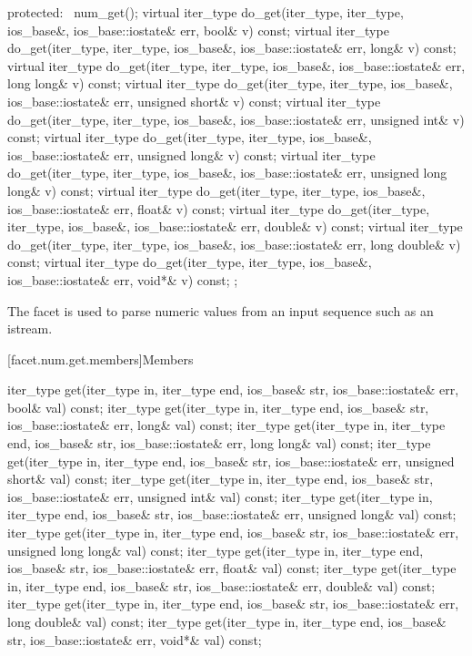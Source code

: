 \begin{codeblock}
{{  protected:
    ~num_get();
    virtual iter_type do_get(iter_type, iter_type, ios_base&,
                             ios_base::iostate& err, bool& v) const;
    virtual iter_type do_get(iter_type, iter_type, ios_base&,
                             ios_base::iostate& err, long& v) const;
    virtual iter_type do_get(iter_type, iter_type, ios_base&,
                             ios_base::iostate& err, long long& v) const;
    virtual iter_type do_get(iter_type, iter_type, ios_base&,
                             ios_base::iostate& err, unsigned short& v) const;
    virtual iter_type do_get(iter_type, iter_type, ios_base&,
                             ios_base::iostate& err, unsigned int& v) const;
    virtual iter_type do_get(iter_type, iter_type, ios_base&,
                             ios_base::iostate& err, unsigned long& v) const;
    virtual iter_type do_get(iter_type, iter_type, ios_base&,
                             ios_base::iostate& err, unsigned long long& v) const;
    virtual iter_type do_get(iter_type, iter_type, ios_base&,
                             ios_base::iostate& err, float& v) const;
    virtual iter_type do_get(iter_type, iter_type, ios_base&,
                             ios_base::iostate& err, double& v) const;
    virtual iter_type do_get(iter_type, iter_type, ios_base&,
                             ios_base::iostate& err, long double& v) const;
    virtual iter_type do_get(iter_type, iter_type, ios_base&,
                             ios_base::iostate& err, void*& v) const;
  };
}
\end{codeblock}

\pnum
The facet  is used to parse numeric values
from an input sequence such as an istream.

[facet.num.get.members]{Members}

%
\begin{itemdecl}
iter_type get(iter_type in, iter_type end, ios_base& str,
              ios_base::iostate& err, bool& val) const;
iter_type get(iter_type in, iter_type end, ios_base& str,
              ios_base::iostate& err, long& val) const;
iter_type get(iter_type in, iter_type end, ios_base& str,
              ios_base::iostate& err, long long& val) const;
iter_type get(iter_type in, iter_type end, ios_base& str,
              ios_base::iostate& err, unsigned short& val) const;
iter_type get(iter_type in, iter_type end, ios_base& str,
              ios_base::iostate& err, unsigned int& val) const;
iter_type get(iter_type in, iter_type end, ios_base& str,
              ios_base::iostate& err, unsigned long& val) const;
iter_type get(iter_type in, iter_type end, ios_base& str,
              ios_base::iostate& err, unsigned long long& val) const;
iter_type get(iter_type in, iter_type end, ios_base& str,
              ios_base::iostate& err, float& val) const;
iter_type get(iter_type in, iter_type end, ios_base& str,
              ios_base::iostate& err, double& val) const;
iter_type get(iter_type in, iter_type end, ios_base& str,
              ios_base::iostate& err, long double& val) const;
iter_type get(iter_type in, iter_type end, ios_base& str,
              ios_base::iostate& err, void*& val) const;
\end{itemdecl}

